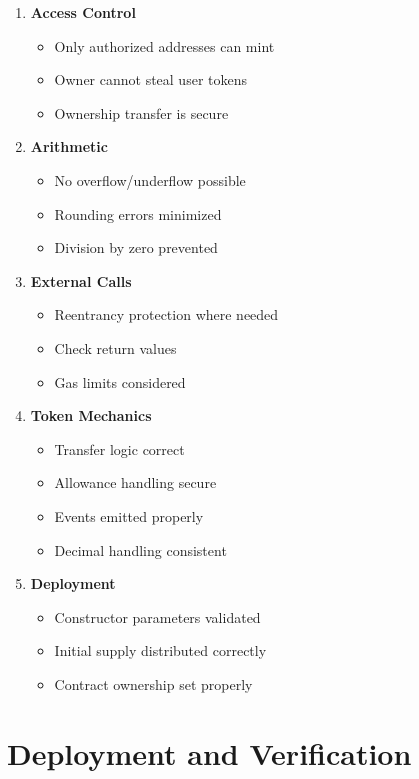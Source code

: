 \documentclass[11pt,a4paper]{article}
\begin{document}
\begin{enumerate}
  \item \textbf{Access Control}
    \begin{itemize}
      \item Only authorized addresses can mint
      \item Owner cannot steal user tokens
      \item Ownership transfer is secure
    \end{itemize}

  \item \textbf{Arithmetic}
    \begin{itemize}
      \item No overflow/underflow possible
      \item Rounding errors minimized
      \item Division by zero prevented
    \end{itemize}

  \item \textbf{External Calls}
    \begin{itemize}
      \item Reentrancy protection where needed
      \item Check return values
      \item Gas limits considered
    \end{itemize}

  \item \textbf{Token Mechanics}
    \begin{itemize}
      \item Transfer logic correct
      \item Allowance handling secure
      \item Events emitted properly
      \item Decimal handling consistent
    \end{itemize}

  \item \textbf{Deployment}
    \begin{itemize}
      \item Constructor parameters validated
      \item Initial supply distributed correctly
      \item Contract ownership set properly
    \end{itemize}
\end{enumerate}

\section{Deployment and Verification}
\end{document}
